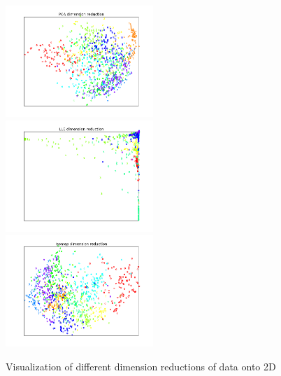 \documentclass[11pt]{article}
\begin{document}
\begin{figure}[H]
\begin{center}
\includegraphics[width=2.2in]{pca_new.png}
\includegraphics[width=2.2in]{lle_new.png}
\includegraphics[width=2.2in]{isomap_new.png}
\end{center}
\caption{Visualization of different dimension reductions of data onto 2D}
\label{reduce_all_digits}
\end{figure}
\end{document}
